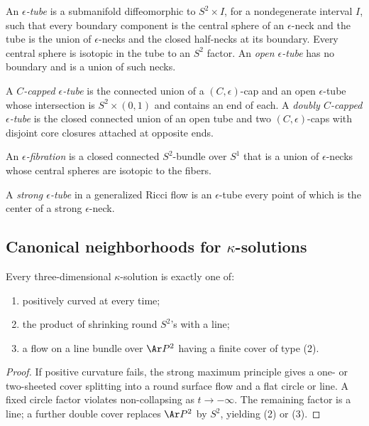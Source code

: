\begin{definition}\label{def:epsilon-tube}
\label{epstube}
An \emph{$\epsilon$-tube} is a submanifold diffeomorphic to
$S^2\times I$, for a nondegenerate interval $I$, such that every
boundary component is the central sphere of an $\epsilon$-neck and
the tube is the union of $\epsilon$-necks and the closed half-necks
at its boundary. Every central sphere is isotopic in the tube to an
$S^2$ factor. An \emph{open $\epsilon$-tube} has no boundary and is
a union of such necks.

A \emph{$C$-capped $\epsilon$-tube} is the connected union of a
$(C,\epsilon)$-cap and an open $\epsilon$-tube whose intersection is
$S^2\times(0,1)$ and contains an end of each. A
\emph{doubly $C$-capped $\epsilon$-tube} is the closed connected
union of an open tube and two $(C,\epsilon)$-caps with disjoint core
closures attached at opposite ends.

An \emph{$\epsilon$-fibration} is a closed connected
$S^2$-bundle over $S^1$ that is a union of $\epsilon$-necks whose
central spheres are isotopic to the fibers.
\end{definition}

\begin{definition}\label{def:strong-epsilon-tube}
A \emph{strong $\epsilon$-tube} in a generalized Ricci flow is an
$\epsilon$-tube every point of which is the center of a strong
$\epsilon$-neck.
\end{definition}

\subsection{Canonical neighborhoods for $\kappa$-solutions}

\begin{proposition}\label{prop:kappa-solution-trichotomy}
\label{infprod2}
Every three-dimensional $\kappa$-solution is exactly one of:
\begin{enumerate}
\item[(1)] positively curved at every time;
\item[(2)] the product of shrinking round $S^2$'s with a line;
\item[(3)] a flow on a line bundle over $\Ar P^2$ having a finite
cover of type (2).
\end{enumerate}
\end{proposition}
\begin{proof}
\sketch If positive curvature fails, the strong maximum principle
gives a one- or two-sheeted cover splitting into a round surface
flow and a flat circle or line. A fixed circle factor violates
non-collapsing as $t\to-\infty$. The remaining factor is a line; a
further double cover replaces $\Ar P^2$ by $S^2$, yielding (2) or
(3).
\end{proof}

